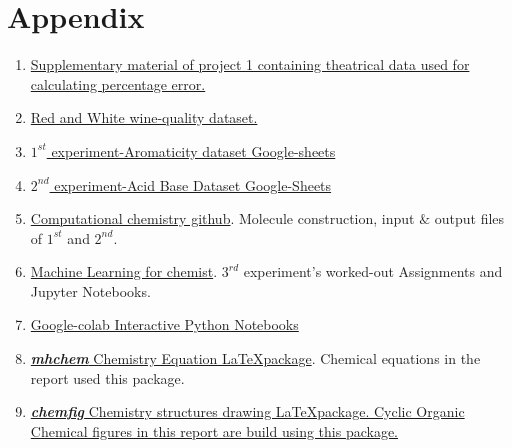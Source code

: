 \documentclass[12pt]{article}
\begin{document}
\newpage



\newpage
\section*{Appendix}
\begin{enumerate}
    \item \href{https://pubs.acs.org/doi/suppl/10.1021/ed082p953/suppl_file/jce2005p0953w.pdf}{Supplementary material of project 1 containing theatrical data used for calculating percentage error.}
    \item \href{https://archive.ics.uci.edu/dataset/186/wine+quality}{Red and White wine-quality dataset. }
    \item \href{https://docs.google.com/spreadsheets/d/1YVUVZeZ_wiyl1l1sGVrfcRbrWC0P5ydPrFI7W2mUbzQ/edit?usp=sharing}{$1^{st}$ experiment-Aromaticity dataset Google-sheets}
    \item \href{https://docs.google.com/spreadsheets/d/1DhclPD_BuQI6k3KOSAlNELtijxsx-F_Mzil6ODMJ_lI/edit?usp=sharing}{$2^{nd}$ experiment-Acid Base Dataset Google-Sheets}
    \item \href{https://github.com/jeevakathirvel11/Summer_Internship}{Computational chemistry github}. Molecule construction, input $\&$ output files of $1^{st}$ and $2^{nd}$.
    \item \href{https://github.com/jeevakathirvel11/Intro-to-Machine-Learning-in-Chemistry.git}{Machine Learning for chemist}. $3^{rd}$ experiment's worked-out Assignments and Jupyter Notebooks.
    \item \href{https://drive.google.com/drive/folders/1kaaZYR6s1578xgS4SVJjO0Ni_yRnoT6p?usp=sharing}{Google-colab Interactive Python Notebooks}
    \item \href{https://in.mirrors.cicku.me/ctan/macros/latex/contrib/mhchem/mhchem.pdf}{\textit{\textbf{mhchem}} Chemistry Equation \LaTeX package}. Chemical equations in the report used this package.
    \item \href{https://mirror.niser.ac.in/ctan/macros/generic/chemfig/chemfig-en.pdf}{\textit{\textbf{chemfig}} Chemistry structures drawing \LaTeX package. Cyclic Organic Chemical figures in this report are build using this package.}
\end{enumerate}





\noindent\dotfill
\end{document}
